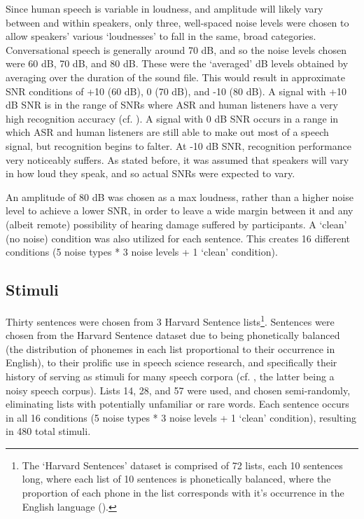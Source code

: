 Since human speech is variable in loudness, and amplitude will likely vary between and within speakers, only three, well-spaced noise levels were chosen to allow speakers' various `loudnesses' to fall in the same, broad categories.  Conversational speech is generally around 70 dB, and so the noise levels chosen were 60 dB, 70 dB, and 80 dB.  These were the `averaged' dB levels obtained by averaging over the duration of the sound file.  This would result in approximate SNR conditions of +10 (60 dB), 0 (70 dB), and -10 (80 dB).  A signal with +10 dB SNR is in the range of SNRs where ASR and human listeners have a very high recognition accuracy (cf. \cite{braun:16,gilbert:13}).  A signal with 0 dB SNR occurs in a range in which ASR and human listeners are still able to make out most of a speech signal, but recognition begins to falter.  At -10 dB SNR, recognition performance very noticeably suffers.  As stated before, it was assumed that speakers will vary in how loud they speak, and so actual SNRs were expected to vary.

An amplitude of 80 dB was chosen as a max loudness, rather than a higher noise level to achieve a lower SNR, in order to leave a wide margin between it and any (albeit remote) possibility of hearing damage suffered by participants.  A `clean' (no noise) condition was also utilized for each sentence.  This creates 16 different conditions (5 noise types * 3 noise levels + 1 `clean' condition).  

\subsection{Stimuli}
Thirty sentences were chosen from 3 Harvard Sentence lists\footnote{The `Harvard Sentences' dataset is comprised of 72 lists, each 10 sentences long, where each list of 10 sentences is phonetically balanced, where the proportion of each phone in the list corresponds with it's occurrence in the English language (\cite{harvardSents}).}.  Sentences were chosen from the Harvard Sentence dataset due to being phonetically balanced (the distribution of phonemes in each list proportional to their occurrence in English), to their prolific use in speech science research, and specifically their history of serving as stimuli for many speech corpora (cf. \cite{kabal:02,hu:07}, the latter being a noisy speech corpus).  Lists 14, 28, and 57 were used, and chosen semi-randomly, eliminating lists with potentially unfamiliar or rare words.  Each sentence occurs in all 16 conditions (5 noise types * 3 noise levels + 1 `clean' condition), resulting in 480 total stimuli.

